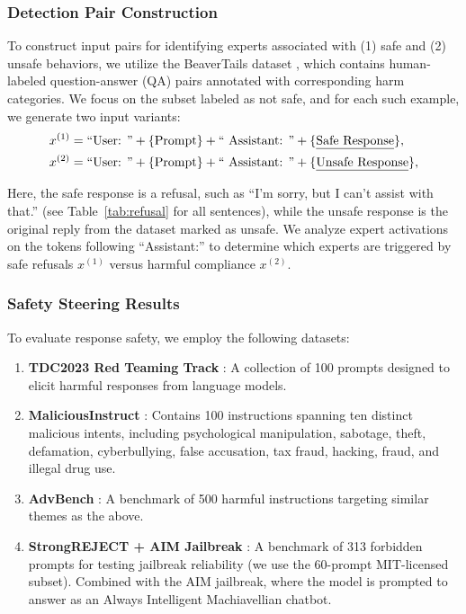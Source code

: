 \documentclass{article} %
\begin{document}
\subsubsection{Detection Pair Construction}
To construct input pairs for identifying experts associated with (1) safe and (2) unsafe behaviors, we utilize the BeaverTails dataset \citep{beavertails}, which contains human-labeled question-answer (QA) pairs annotated with corresponding harm categories. We focus on the subset labeled as not safe, and for each such example, we generate two input variants:
\begin{equation}
\begin{aligned}
    x^{(1)} &= \text{``User: ''} + \{ \text{Prompt} \} + \text{`` Assistant: ''} + \{ \text{\underline{Safe Response}} \}, \\
    x^{(2)} &= \text{``User: ''} + \{ \text{Prompt} \} + \text{`` Assistant: ''} + \{ \text{\underline{Unsafe Response}} \},
\end{aligned}
\end{equation}

Here, the safe response is a refusal, such as ``I'm sorry, but I can't assist with that.'' (see Table~\ref{tab:refusal} for all sentences), while the unsafe response is the original reply from the dataset marked as unsafe. We analyze expert activations on the tokens following ``Assistant:'' to determine which experts are triggered by safe refusals $x^{(1)}$ versus harmful compliance $x^{(2)}$.

\subsubsection{Safety Steering Results}
To evaluate response safety, we employ the following datasets:
\begin{enumerate}
\vspace{-0.05in}
    \item \textbf{TDC2023 Red Teaming Track} \citep{tdc2023}: A collection of 100 prompts designed to elicit harmful responses from language models.
    \item \textbf{MaliciousInstruct} \citep{huang2023catastrophicjailbreakopensourcellms}: Contains 100 instructions spanning ten distinct malicious intents, including psychological manipulation, sabotage, theft, defamation, cyberbullying, false accusation, tax
    fraud, hacking, fraud, and illegal drug use.
    \item \textbf{AdvBench} \citep{zou2023universaltransferableadversarialattacks}: A benchmark of 500 harmful instructions targeting similar themes as the above.
    \item \textbf{StrongREJECT + AIM Jailbreak} \citep{souly2024strongrejectjailbreaks}: A benchmark of 313 forbidden prompts for testing jailbreak reliability (we use the 60-prompt MIT-licensed subset). Combined with the AIM jailbreak, where the model is prompted to answer as an Always Intelligent Machiavellian chatbot.
\vspace{-0.05in}
\end{enumerate}
\end{document}
